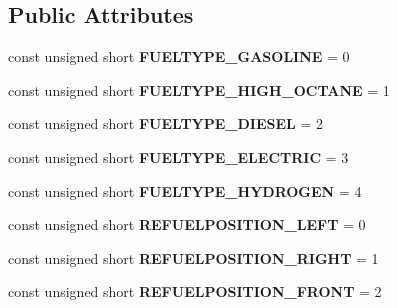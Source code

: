\subsection*{Public Attributes}
\begin{DoxyCompactItemize}
\item 
\hypertarget{interfaceVehicle_1_1FuelInfo_a30ed62ca426679f95cfcb6427ed2c4ef}{const unsigned short {\bfseries F\-U\-E\-L\-T\-Y\-P\-E\-\_\-\-G\-A\-S\-O\-L\-I\-N\-E} = 0}\label{interfaceVehicle_1_1FuelInfo_a30ed62ca426679f95cfcb6427ed2c4ef}

\item 
\hypertarget{interfaceVehicle_1_1FuelInfo_af574036d71866d4eb3b806974b7f3d2a}{const unsigned short {\bfseries F\-U\-E\-L\-T\-Y\-P\-E\-\_\-\-H\-I\-G\-H\-\_\-\-O\-C\-T\-A\-N\-E} = 1}\label{interfaceVehicle_1_1FuelInfo_af574036d71866d4eb3b806974b7f3d2a}

\item 
\hypertarget{interfaceVehicle_1_1FuelInfo_a1e6b28e7a4d3d3d910e893b34e941229}{const unsigned short {\bfseries F\-U\-E\-L\-T\-Y\-P\-E\-\_\-\-D\-I\-E\-S\-E\-L} = 2}\label{interfaceVehicle_1_1FuelInfo_a1e6b28e7a4d3d3d910e893b34e941229}

\item 
\hypertarget{interfaceVehicle_1_1FuelInfo_a50a667b0c52b4203951ddd48bea1ca37}{const unsigned short {\bfseries F\-U\-E\-L\-T\-Y\-P\-E\-\_\-\-E\-L\-E\-C\-T\-R\-I\-C} = 3}\label{interfaceVehicle_1_1FuelInfo_a50a667b0c52b4203951ddd48bea1ca37}

\item 
\hypertarget{interfaceVehicle_1_1FuelInfo_aaa296ef780a0311b00f4f064a7ee2a9b}{const unsigned short {\bfseries F\-U\-E\-L\-T\-Y\-P\-E\-\_\-\-H\-Y\-D\-R\-O\-G\-E\-N} = 4}\label{interfaceVehicle_1_1FuelInfo_aaa296ef780a0311b00f4f064a7ee2a9b}

\item 
\hypertarget{interfaceVehicle_1_1FuelInfo_a40240e3f03008811f89a6e36d5a1525b}{const unsigned short {\bfseries R\-E\-F\-U\-E\-L\-P\-O\-S\-I\-T\-I\-O\-N\-\_\-\-L\-E\-F\-T} = 0}\label{interfaceVehicle_1_1FuelInfo_a40240e3f03008811f89a6e36d5a1525b}

\item 
\hypertarget{interfaceVehicle_1_1FuelInfo_ae4d57f6c3e3615fa8c601a9502be8dd6}{const unsigned short {\bfseries R\-E\-F\-U\-E\-L\-P\-O\-S\-I\-T\-I\-O\-N\-\_\-\-R\-I\-G\-H\-T} = 1}\label{interfaceVehicle_1_1FuelInfo_ae4d57f6c3e3615fa8c601a9502be8dd6}

\item 
\hypertarget{interfaceVehicle_1_1FuelInfo_a23a7da1cdb4f99eefa0e5940c8721dfc}{const unsigned short {\bfseries R\-E\-F\-U\-E\-L\-P\-O\-S\-I\-T\-I\-O\-N\-\_\-\-F\-R\-O\-N\-T} = 2}\label{interfaceVehicle_1_1FuelInfo_a23a7da1cdb4f99eefa0e5940c8721dfc}


\end{DoxyCompactItemize}
